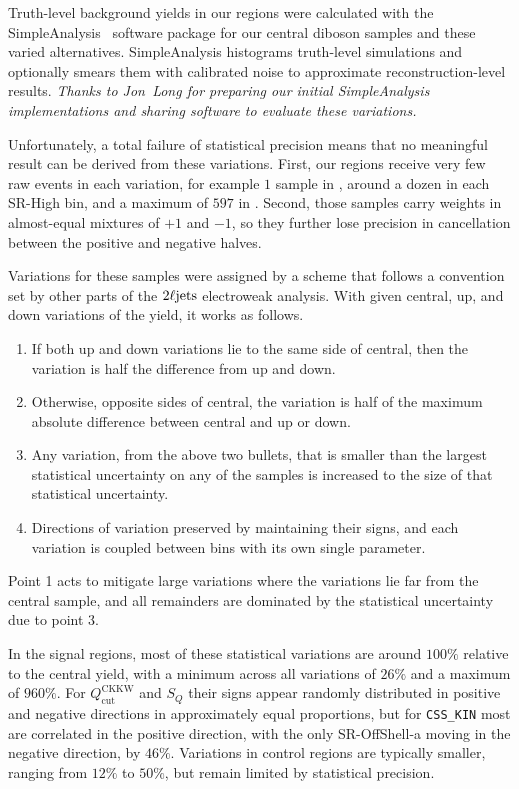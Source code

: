 Truth-level background yields in our regions were calculated with the
SimpleAnalysis~\cite{Lorenz:2752450,simpleanalysis_cern}
software package for
our central diboson samples and these varied alternatives.
SimpleAnalysis histograms truth-level simulations and optionally smears them
with calibrated noise to approximate reconstruction-level results.
\emph{Thanks to Jon~Long for preparing our initial
SimpleAnalysis implementations and sharing software to evaluate these
variations.}

Unfortunately, a total failure of statistical precision means that no
meaningful result can be derived from these variations.
First, our regions receive very few raw events in each variation,
for example $1$ sample in \srllbb, around a dozen in
each SR-High bin, and a maximum of $597$ in \crvz.
Second, those samples carry weights in almost-equal mixtures of $+1$ and $-1$,
so they further lose precision in cancellation between the positive and
negative halves.

Variations for these samples were assigned by a scheme that follows a
convention set by other parts of the $2\ell\mathrm{jets}$ electroweak analysis.
With given central, up, and down variations of the yield, it works as
follows.
\begin{enumerate}
\item If both up and down variations lie to the same side of central, then
the variation is half the difference from up and down.
\item Otherwise, opposite sides of central, the variation is half of the
maximum absolute difference between central and up or down.
\item Any variation, from the above two bullets, that is smaller than the
largest statistical uncertainty on any of the samples is increased to the size
of that statistical uncertainty.
\item Directions of variation preserved by maintaining their signs, and
each variation is coupled between bins with its own single parameter.
\end{enumerate}
Point 1 acts to mitigate large variations where the variations lie far from
the central sample,
and all remainders are dominated by the statistical uncertainty due to point 3.

In the signal regions, most of these statistical variations are around
$100\%$ relative to the central yield, with a minimum across all variations
of $26\%$ and a maximum of $960\%$.
For $Q_\textrm{cut}^\textrm{CKKW}$ and $S_Q$ their signs appear randomly
distributed in positive and negative directions in approximately equal
proportions, but for \texttt{CSS\_KIN} most are correlated in the positive
direction, with the only SR-OffShell-a moving in the negative direction, by
$46\%$.
Variations in control regions are typically smaller, ranging from $12\%$ to
$50\%$, but remain limited by statistical precision.

